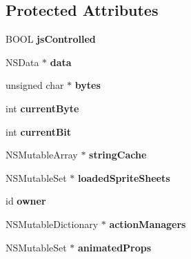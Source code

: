 \subsection*{Protected Attributes}
\begin{DoxyCompactItemize}
\item 
\hypertarget{interface_c_c_b_reader_a5b136a17239cc2f5663a547d9b7d4990}{B\-O\-O\-L {\bfseries js\-Controlled}}\label{interface_c_c_b_reader_a5b136a17239cc2f5663a547d9b7d4990}

\item 
\hypertarget{interface_c_c_b_reader_a8afcb2b5c0be7387c64239f4298d5d71}{N\-S\-Data $\ast$ {\bfseries data}}\label{interface_c_c_b_reader_a8afcb2b5c0be7387c64239f4298d5d71}

\item 
\hypertarget{interface_c_c_b_reader_a58a6af2d1668587a919be1f1033d46a3}{unsigned char $\ast$ {\bfseries bytes}}\label{interface_c_c_b_reader_a58a6af2d1668587a919be1f1033d46a3}

\item 
\hypertarget{interface_c_c_b_reader_a66e6212dc29619e613f456bd559ab8fa}{int {\bfseries current\-Byte}}\label{interface_c_c_b_reader_a66e6212dc29619e613f456bd559ab8fa}

\item 
\hypertarget{interface_c_c_b_reader_a8f8aec83320dff12b38b295574f6e42f}{int {\bfseries current\-Bit}}\label{interface_c_c_b_reader_a8f8aec83320dff12b38b295574f6e42f}

\item 
\hypertarget{interface_c_c_b_reader_af7773848f5d6a64906cb010a2a1ac322}{N\-S\-Mutable\-Array $\ast$ {\bfseries string\-Cache}}\label{interface_c_c_b_reader_af7773848f5d6a64906cb010a2a1ac322}

\item 
\hypertarget{interface_c_c_b_reader_ab8b9ad110f9ee2c42304f2b261a8b79d}{N\-S\-Mutable\-Set $\ast$ {\bfseries loaded\-Sprite\-Sheets}}\label{interface_c_c_b_reader_ab8b9ad110f9ee2c42304f2b261a8b79d}

\item 
\hypertarget{interface_c_c_b_reader_a836d9a4f3650479c2dca01be3a0fd3e8}{id {\bfseries owner}}\label{interface_c_c_b_reader_a836d9a4f3650479c2dca01be3a0fd3e8}

\item 
\hypertarget{interface_c_c_b_reader_a07c8537402d1b9d83b45f3a903728bcd}{N\-S\-Mutable\-Dictionary $\ast$ {\bfseries action\-Managers}}\label{interface_c_c_b_reader_a07c8537402d1b9d83b45f3a903728bcd}

\item 
\hypertarget{interface_c_c_b_reader_a19d9cf8eb5596b84e8ac922e4634f72f}{N\-S\-Mutable\-Set $\ast$ {\bfseries animated\-Props}}\label{interface_c_c_b_reader_a19d9cf8eb5596b84e8ac922e4634f72f}

\end{DoxyCompactItemize}
